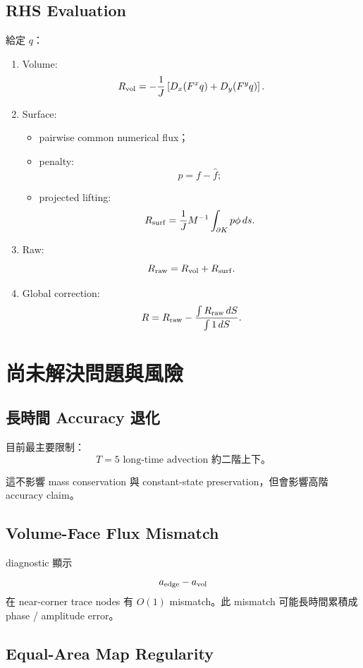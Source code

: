 \documentclass[UTF8,12pt,a4paper]{ctexart}
\begin{document}
\subsection{RHS Evaluation}

給定 $q$：

\begin{enumerate}
  \item Volume:
  \[
  R_{\rm vol}
  =
  -\frac{1}{J}
  \left[
  D_x(F^xq)+D_y(F^yq)
  \right].
  \]

  \item Surface:
  \begin{itemize}
    \item pairwise common numerical flux；
    \item penalty:
    \[
    p=f-\hat f;
    \]
    \item projected lifting:
    \[
    R_{\rm surf}
    =
    \frac{1}{J}
    M^{-1}
    \int_{\partial K}p\phi\,ds.
    \]
  \end{itemize}

  \item Raw:
  \[
  R_{\rm raw}=R_{\rm vol}+R_{\rm surf}.
  \]

  \item Global correction:
  \[
  R
  =
  R_{\rm raw}
  -
  \frac{\int R_{\rm raw}\,dS}{\int1\,dS}.
  \]
\end{enumerate}

\section{尚未解決問題與風險}

\subsection{長時間 Accuracy 退化}

目前最主要限制：
\[
\boxed{
T=5\text{ long-time advection 約二階上下。}
}
\]

這不影響 mass conservation 與 constant-state preservation，但會影響高階 accuracy claim。

\subsection{Volume-Face Flux Mismatch}

diagnostic 顯示
\[
a_{\rm edge}-a_{\rm vol}
\]
在 near-corner trace nodes 有 $O(1)$ mismatch。此 mismatch 可能長時間累積成 phase / amplitude error。

\subsection{Equal-Area Map Regularity}
\end{document}
